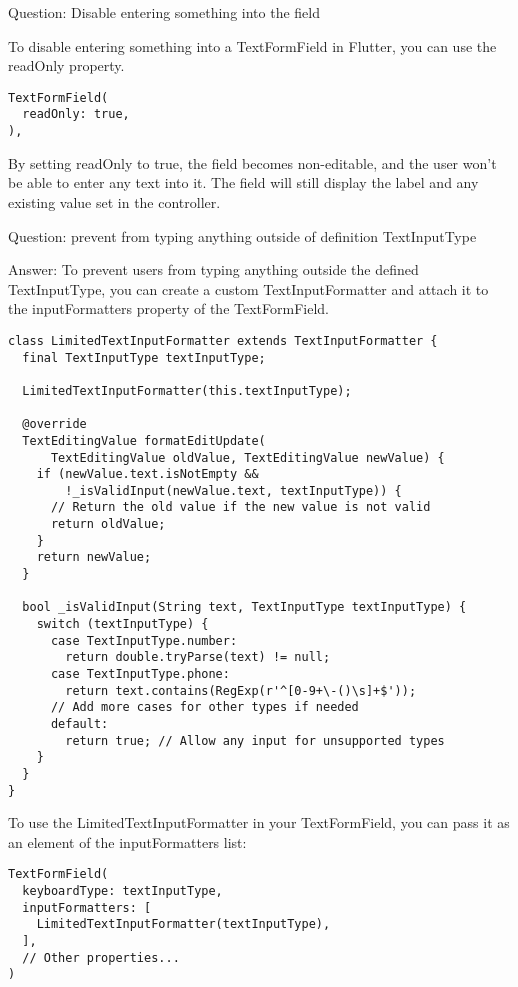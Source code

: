 Question: Disable entering something into the field

To disable entering something into a TextFormField in Flutter, you can use the readOnly property. 

\begin{lstlisting}
TextFormField(
  readOnly: true,
),
\end{lstlisting}


By setting readOnly to true, the field becomes non-editable, and the user won't be able to enter any text into it. 
The field will still display the label and any existing value set in the controller.

Question: prevent from typing anything outside of definition TextInputType

Answer: To prevent users from typing anything outside the defined TextInputType, you can create a custom 
TextInputFormatter and attach it to the inputFormatters property of the TextFormField.

\begin{lstlisting}
class LimitedTextInputFormatter extends TextInputFormatter {
  final TextInputType textInputType;

  LimitedTextInputFormatter(this.textInputType);

  @override
  TextEditingValue formatEditUpdate(
      TextEditingValue oldValue, TextEditingValue newValue) {
    if (newValue.text.isNotEmpty &&
        !_isValidInput(newValue.text, textInputType)) {
      // Return the old value if the new value is not valid
      return oldValue;
    }
    return newValue;
  }

  bool _isValidInput(String text, TextInputType textInputType) {
    switch (textInputType) {
      case TextInputType.number:
        return double.tryParse(text) != null;
      case TextInputType.phone:
        return text.contains(RegExp(r'^[0-9+\-()\s]+$'));
      // Add more cases for other types if needed
      default:
        return true; // Allow any input for unsupported types
    }
  }
}
\end{lstlisting}

To use the LimitedTextInputFormatter in your TextFormField, you can pass it as an element of the inputFormatters list:

\begin{lstlisting}
TextFormField(
  keyboardType: textInputType,
  inputFormatters: [
    LimitedTextInputFormatter(textInputType),
  ],
  // Other properties...
)
\end{lstlisting}

